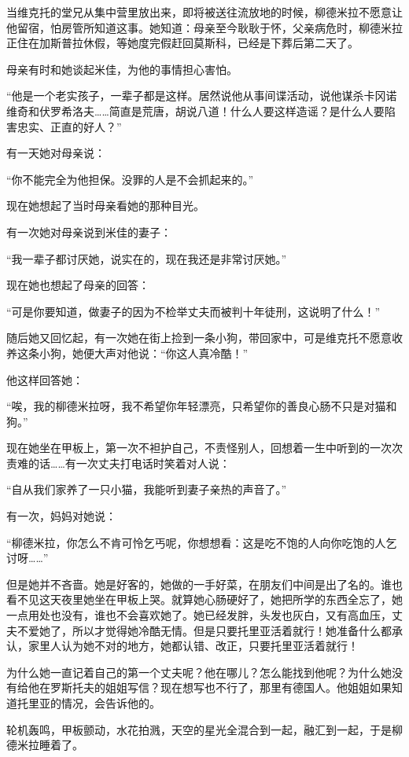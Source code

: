 当维克托的堂兄从集中营里放出来，即将被送往流放地的时候，柳德米拉不愿意让他留宿，怕房管所知道这事。她知道：母亲至今耿耿于怀，父亲病危时，柳德米拉正住在加斯普拉休假，等她度完假赶回莫斯科，已经是下葬后第二天了。

母亲有时和她谈起米佳，为他的事情担心害怕。

“他是一个老实孩子，一辈子都是这样。居然说他从事间谍活动，说他谋杀卡冈诺维奇和伏罗希洛夫……简直是荒唐，胡说八道！什么人要这样造谣？是什么人要陷害忠实、正直的好人？”

有一天她对母亲说：

“你不能完全为他担保。没罪的人是不会抓起来的。”

现在她想起了当时母亲看她的那种目光。

有一次她对母亲说到米佳的妻子：

“我一辈子都讨厌她，说实在的，现在我还是非常讨厌她。”

现在她也想起了母亲的回答：

“可是你要知道，做妻子的因为不检举丈夫而被判十年徒刑，这说明了什么！”

随后她又回忆起，有一次她在街上捡到一条小狗，带回家中，可是维克托不愿意收养这条小狗，她便大声对他说：“你这人真冷酷！”

他这样回答她：

“唉，我的柳德米拉呀，我不希望你年轻漂亮，只希望你的善良心肠不只是对猫和狗。”

现在她坐在甲板上，第一次不袒护自己，不责怪别人，回想着一生中听到的一次次责难的话……有一次丈夫打电话时笑着对人说：

“自从我们家养了一只小猫，我能听到妻子亲热的声音了。”

有一次，妈妈对她说：

“柳德米拉，你怎么不肯可怜乞丐呢，你想想看：这是吃不饱的人向你吃饱的人乞讨呀……”

但是她并不吝啬。她是好客的，她做的一手好菜，在朋友们中间是出了名的。谁也看不见这天夜里她坐在甲板上哭。就算她心肠硬好了，她把所学的东西全忘了，她一点用处也没有，谁也不会喜欢她了。她已经发胖，头发也灰白，又有高血压，丈夫不爱她了，所以才觉得她冷酷无情。但是只要托里亚活着就行！她准备什么都承认，家里人认为她不对的地方，她都认错、改正，只要托里亚活着就行！

为什么她一直记着自己的第一个丈夫呢？他在哪儿？怎么能找到他呢？为什么她没有给他在罗斯托夫的姐姐写信？现在想写也不行了，那里有德国人。他姐姐如果知道托里亚的情况，会告诉他的。

轮机轰鸣，甲板颤动，水花拍溅，天空的星光全混合到一起，融汇到一起，于是柳德米拉睡着了。


